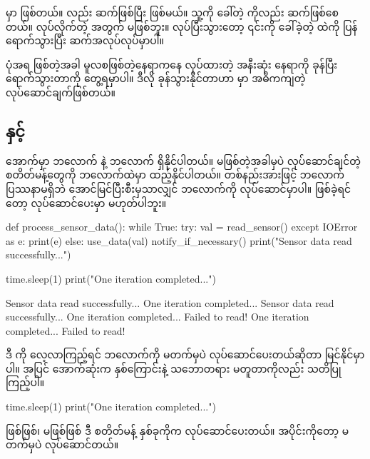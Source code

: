  မှာ  ဖြစ်တယ်။  လည်း  ဆက်ဖြစ်ပြီး  ဖြစ်မယ်။ သူ့ကို ခေါ်တဲ့  ကိုလည်း  ဆက်ဖြစ်စေတယ်။   လုပ်လိုက်တဲ့ အတွက်  မဖြစ်ဘူး။  လုပ်ပြီးသွားတော့  ၎င်းကို ခေါ်ခဲ့တဲ့  ထဲကို ပြန်ရောက်သွားပြီး  ဆက်အလုပ်လုပ်မှာပါ။ 

ပုံအရ  ဖြစ်တဲ့အခါ မူလစဖြစ်တဲ့နေရာကနေ  လုပ်ထားတဲ့ အနီးဆုံး နေရာကို ခုန်ပြီးရောက်သွားတာကို တွေ့ရမှာပါ။ ဒီလို ခုန်သွားနိုင်တာဟာ  မှာ အဓိကကျတဲ့ လုပ်ဆောင်ချက်ဖြစ်တယ်။ 

\subsection*{ နှင့် }
 အောက်မှာ  ဘလောက် နဲ့   ဘလောက် ရှိနိုင်ပါတယ်။  မဖြစ်တဲ့အခါမှပဲ လုပ်ဆောင်ချင်တဲ့ စတိတ်မန့်တွေကို  ဘလောက်ထဲမှာ ထည့်နိုင်ပါတယ်။ တစ်နည်း\allowbreak အားဖြင့်  ဘလောက် ပြဿနာမရှိဘဲ အောင်မြင်ပြီးစီးမှသာလျှင်  ဘလောက်ကို လုပ်ဆောင်မှာပါ။  ဖြစ်ခဲ့ရင်တော့ လုပ်ဆောင်ပေးမှာ မဟုတ်ပါဘူး။
%
%
\begin{py}
def process_sensor_data():
    while True:
        try:
            val = read_sensor()
        except IOError as e:
            print(e)
        else:
            use_data(val)
            notify_if_necessary()
            print("Sensor data read successfully...")

        time.sleep(1)
        print("One iteration completed...")
\end{py}
%
%
\begin{codetxt}
Sensor data read successfully...
One iteration completed...
Sensor data read successfully...
One iteration completed...
Failed to read!
One iteration completed...
Failed to read!
\end{codetxt}
ဒီ  ကို လေ့လာကြည့်ရင်  ဘလောက်ကို  မတက်မှပဲ လုပ်ဆောင်ပေးတယ်ဆိုတာ မြင်နိုင်မှာပါ။   အပြင် အောက်ဆုံးက နှစ်ကြောင်းနဲ့ သဘောတရား မတူတာကိုလည်း သတိပြု ကြည့်ပါ။
%
%
\begin{py}
time.sleep(1)
print("One iteration completed...")
\end{py}
%
% 
 ဖြစ်ဖြစ်၊ မဖြစ်ဖြစ် ဒီ စတိတ်မန့် နှစ်ခုကိုက လုပ်ဆောင်ပေးတယ်။  အပိုင်းကိုတော့  မတက်မှပဲ လုပ်ဆောင်တယ်။ 

